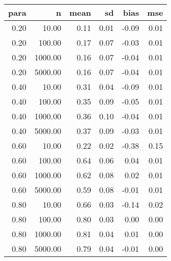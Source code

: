\begin{table}[ht]
\centering
\begin{tabular}{rrrrrr}
  \hline
para & n & mean & sd & bias & mse \\ 
  \hline
0.20 & 10.00 & 0.11 & 0.01 & -0.09 & 0.01 \\ 
  0.20 & 100.00 & 0.17 & 0.07 & -0.03 & 0.01 \\ 
  0.20 & 1000.00 & 0.16 & 0.07 & -0.04 & 0.01 \\ 
  0.20 & 5000.00 & 0.16 & 0.07 & -0.04 & 0.01 \\ 
  0.40 & 10.00 & 0.31 & 0.04 & -0.09 & 0.01 \\ 
  0.40 & 100.00 & 0.35 & 0.09 & -0.05 & 0.01 \\ 
  0.40 & 1000.00 & 0.36 & 0.10 & -0.04 & 0.01 \\ 
  0.40 & 5000.00 & 0.37 & 0.09 & -0.03 & 0.01 \\ 
  0.60 & 10.00 & 0.22 & 0.02 & -0.38 & 0.15 \\ 
  0.60 & 100.00 & 0.64 & 0.06 & 0.04 & 0.01 \\ 
  0.60 & 1000.00 & 0.62 & 0.08 & 0.02 & 0.01 \\ 
  0.60 & 5000.00 & 0.59 & 0.08 & -0.01 & 0.01 \\ 
  0.80 & 10.00 & 0.66 & 0.03 & -0.14 & 0.02 \\ 
  0.80 & 100.00 & 0.80 & 0.03 & 0.00 & 0.00 \\ 
  0.80 & 1000.00 & 0.81 & 0.04 & 0.01 & 0.00 \\ 
  0.80 & 5000.00 & 0.79 & 0.04 & -0.01 & 0.00 \\ 
   \hline
\end{tabular}
\end{table}
